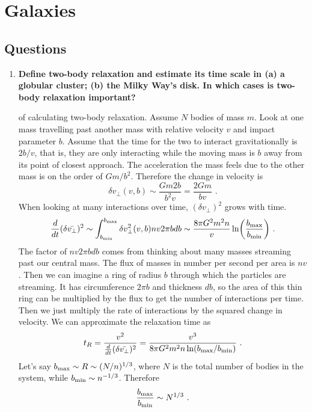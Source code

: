 \section{Galaxies}
\subsection{Questions}
\begin{enumerate}
\item \textbf{Define two-body relaxation and estimate its time scale in (a) a globular cluster; (b)
      the Milky Way's disk. In which cases is two-body relaxation important?}
      
       of calculating two-body relaxation.
      Assume $N$ bodies of mass $m$. Look at one mass travelling past another mass with relative velocity $v$ and impact parameter $b$. Assume that the time for the two to interact gravitationally is $2b/v$, that is, they are only interacting while the moving mass is $b$ away from its point of closest approach. The acceleration the mass feels due to the other mass is on the order of $Gm/b^2$. Therefore the change in velocity is
      \begin{equation}
      \delta v_\perp (v,b) \sim \frac{Gm2b}{b^2v} = \frac{2Gm}{bv}\,\,.
      \end{equation}
      When looking at many interactions over time, $(\delta v_\perp)^2$ grows with time.
      \begin{equation}
      \frac{d}{dt}(\delta \bar{v_\perp})^2 \sim \int^{b_{\rm max}}_{b_{\rm min}}\delta v_\perp^2(v,b) n v 2 \pi b db \sim \frac{8 \pi G^2 m^2 n}{v} \ln \biggl( \frac{b_{\rm max}}{b_{\rm min}} \biggr) \,\, .
      \end{equation}
      The factor of $n v 2 \pi b db$ comes from thinking about many masses streaming past our central mass. The flux of masses in number per second per area is $nv$. Then we can imagine a ring of radius $b$ through which the particles are streaming. It has circumference $2 \pi b$ and thickness $db$, so the area of this thin ring can be multiplied by the flux to get the number of interactions per time. Then we just multiply the rate of interactions by the squared change in velocity. We can approximate the relaxation time as
      \begin{equation}
      t_R = \frac{v^2}{\frac{d}{dt}(\delta \bar{v_\perp})^2} = \frac{v^3}{8 \pi G^2 m^2 n \ln(b_{\rm max}/b_{\rm min})} \,\,.
      \end{equation}
      Let's say $b_{\rm max} \sim R \sim (N/n)^{1/3}$, where $N$ is the total
      number of bodies in the system, while $b_{\rm min} \sim n^{-1/3}$. Therefore
      \begin{equation}
      \frac{b_{\rm max}}{b_{\rm min}} \sim N^{1/3}\,\,.
      \end{equation}
      

\end{enumerate}
